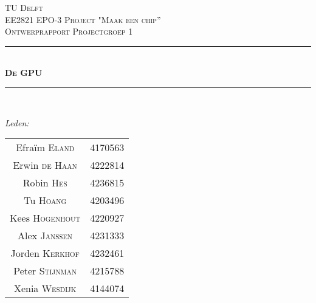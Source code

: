 \documentclass[12pt]{scrreprt}
\begin{document}
\begin{titlepage}

\newcommand{\HRule}{\rule{\linewidth}{0.5mm}} %

\center %
 

\textsc{\LARGE TU Delft}\\[1.5cm] %
\textsc{\Large EE2821 EPO-3 Project "Maak een chip''}\\[0.5cm] %
\textsc{\large Ontwerprapport Projectgroep 1}\\[0.5cm] %


\HRule \\[0.4cm]
\textsc{\huge \bfseries De GPU}\\[0.2cm] %
\HRule \\[1.5cm]
 

\begin{minipage}{0.4\textwidth}
\begin{flushleft} \large
\emph{Leden:}\\
\begin{tabular}{cc}
Efraïm \textsc{Eland} & 4170563 \\
Erwin \textsc{de Haan} & 4222814\\
Robin \textsc{Hes}& 4236815\\
Tu \textsc{Hoang} &4203496 \\
Kees \textsc{Hogenhout} & 4220927\\
Alex \textsc{Janssen} &	4231333\\
Jorden \textsc{Kerkhof} & 4232461\\
Peter \textsc{Stijnman} & 4215788 \\
Xenia \textsc{Wesdijk} & 4144074\\
\end{tabular}


\end{flushleft}
\end{minipage}
\end{titlepage}
\end{document}
